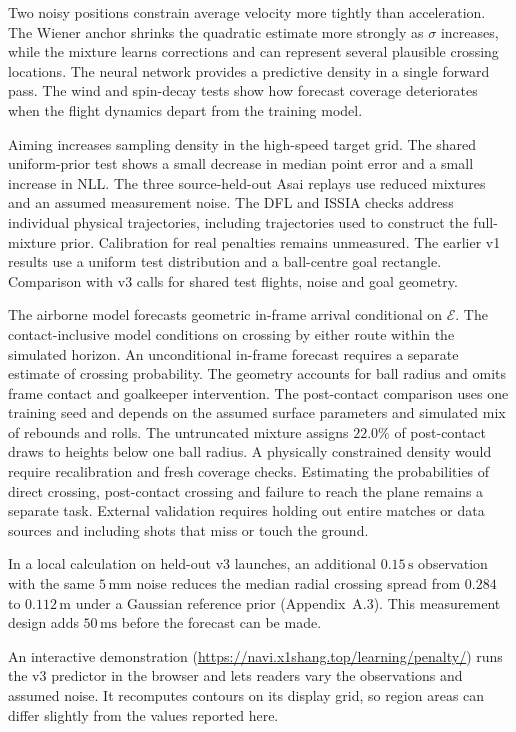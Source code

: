 Two noisy positions constrain average velocity more tightly than acceleration. The Wiener anchor shrinks the quadratic estimate more strongly as $\sigma$ increases, while the mixture learns corrections and can represent several plausible crossing locations. The neural network provides a predictive density in a single forward pass. The wind and spin-decay tests show how forecast coverage deteriorates when the flight dynamics depart from the training model.

Aiming increases sampling density in the high-speed target grid. The shared uniform-prior test shows a small decrease in median point error and a small increase in NLL. The three source-held-out Asai replays use reduced mixtures and an assumed measurement noise. The DFL and ISSIA checks address individual physical trajectories, including trajectories used to construct the full-mixture prior. Calibration for real penalties remains unmeasured. The earlier v1 results use a uniform test distribution and a ball-centre goal rectangle. Comparison with v3 calls for shared test flights, noise and goal geometry.

The airborne model forecasts geometric in-frame arrival conditional on $\mathcal E$. The contact-inclusive model conditions on crossing by either route within the simulated horizon. An unconditional in-frame forecast requires a separate estimate of crossing probability. The geometry accounts for ball radius and omits frame contact and goalkeeper intervention. The post-contact comparison uses one training seed and depends on the assumed surface parameters and simulated mix of rebounds and rolls. The untruncated mixture assigns $22.0\%$ of post-contact draws to heights below one ball radius. A physically constrained density would require recalibration and fresh coverage checks. Estimating the probabilities of direct crossing, post-contact crossing and failure to reach the plane remains a separate task. External validation requires holding out entire matches or data sources and including shots that miss or touch the ground.

In a local calculation on held-out v3 launches, an additional $0.15\,\mathrm{s}$ observation with the same $5\,\mathrm{mm}$ noise reduces the median radial crossing spread from $0.284$ to $0.112\,\mathrm{m}$ under a Gaussian reference prior (Appendix~A.3). This measurement design adds $50\,\mathrm{ms}$ before the forecast can be made.

An interactive demonstration (\url{https://navi.x1shang.top/learning/penalty/}) runs the v3 predictor in the browser and lets readers vary the observations and assumed noise. It recomputes contours on its display grid, so region areas can differ slightly from the values reported here.

